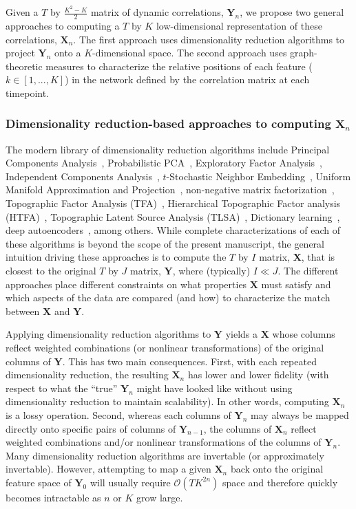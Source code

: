 \documentclass[english]{article}
\begin{document}
Given a $T$ by $\frac{K^2 - K}{2}$ matrix of dynamic correlations,
$\mathbf{Y}_n$, we propose two general approaches to computing a $T$
by $K$ low-dimensional representation of these correlations,
$\mathbf{X}_n$.  The first approach uses dimensionality reduction
algorithms to project $\mathbf{Y}_n$ onto a $K$-dimensional space.
The second approach uses graph-theoretic measures to characterize the
relative positions of each feature ($k \in \left[1, ..., K \right]$)
in the network defined by the correlation matrix at each timepoint.

\subsubsection*{Dimensionality reduction-based approaches to computing
  $\mathbf{X}_n$}

The modern library of dimensionality reduction algorithms include
Principal Components Analysis~\citep[PCA; ][]{Pear01}, Probabilistic
PCA~\citep[PPCA; ][]{TippBish99}, Exploratory Factor
Analysis~\citep[EFA; ][]{Spea04}, Independent Components
Analysis~\citep[ICA; ][]{JuttHera91, ComoEtal91}, $t$-Stochastic
Neighbor Embedding~\citep[$t$-SNE; ][]{MaatHint08}, Uniform Manifold
Approximation and Projection~\citep[UMAP; ][]{McInHeal18},
non-negative matrix factorization~\citep[NMF; ][]{LeeSeun99},
Topographic Factor Analysis (TFA)~\cite{MannEtal14b}, Hierarchical
Topographic Factor analysis (HTFA)~\cite{MannEtal18}, Topographic
Latent Source Analysis (TLSA)~\cite{GersEtal11}, Dictionary
learning~\citep{MairEtal09a, MairEtal09b}, deep
autoencoders~\citep{HintSala06}, among others.  While complete
characterizations of each of these algorithms is beyond the scope of
the present manuscript, the general intuition driving these approaches
is to compute the $T$ by $I$ matrix, $\mathbf{X}$, that is closest
to the original $T$ by $J$ matrix, $\mathbf{Y}$, where (typically)
$I \ll J$.  The different approaches place different constraints on
what properties $\mathbf{X}$ must satisfy and which aspects of
the data are compared (and how) to characterize the match between
$\mathbf{X}$ and $\mathbf{Y}$.

Applying dimensionality reduction algorithms to $\mathbf{Y}$ yields a
$\mathbf{X}$ whose columns reflect weighted combinations (or nonlinear
transformations) of the original columns of $\mathbf{Y}$.  This has
two main consequences.  First, with each repeated dimensionality
reduction, the resulting $\mathbf{X}_n$ has lower and lower fidelity
(with respect to what the ``true'' $\mathbf{Y}_n$ might have looked
like without using dimensionality reduction to maintain scalability).
In other words, computing $\mathbf{X}_n$ is a lossy operation.
Second, whereas each columns of $\mathbf{Y}_n$ may always be mapped
directly onto specific pairs of columns of $\mathbf{Y}_{n-1}$, the
columns of $\mathbf{X}_n$ reflect weighted combinations and/or
nonlinear transformations of the columns of $\mathbf{Y}_n$.  Many
dimensionality reduction algorithms are invertable (or approximately
invertable).  However, attempting to map a given $\mathbf{X}_n$ back
onto the original feature space of $\mathbf{Y}_0$ will usually require
$\mathcal{O}(TK^{2n})$ space and therefore quickly becomes intractable
as $n$ or $K$ grow large.
\end{document}

